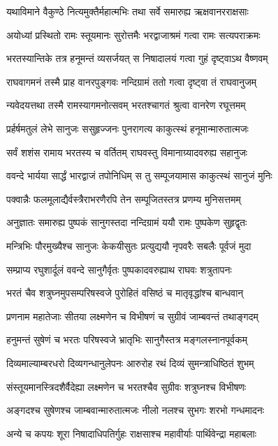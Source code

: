 \twolineshloka
{यथाविमाने वैकुण्ठे नित्यमुक्तैर्महात्मभिः}
{तथा सर्वे समारुह्य ऋक्षवानरराक्षसाः}%

\twolineshloka
{अयोध्यां प्रस्थितो रामः स्तूयमानः सुरोत्तमैः}
{भरद्वाजाश्रमं गत्वा रामः सत्यपराक्रमः}%

\twolineshloka
{भरतस्यान्तिके तत्र हनूमन्तं व्यसर्जयत्}
{स निषादालयं गत्वा गुहं दृष्ट्वाऽथ वैष्णवम्}%

\twolineshloka
{राघवागमनं तस्मै प्राह वानरपुङ्गवः}
{नन्दिग्रामं ततो गत्वा दृष्ट्वा तं राघवानुजम्}%

\twolineshloka
{न्यवेदयत्तथा तस्मै रामस्यागमनोत्सवम्}
{भरतश्चागतं श्रुत्वा वानरेण रघूत्तमम्}%

\twolineshloka
{प्रर्हर्षमतुलं लेभे सानुजः ससुहृज्जनः}
{पुनरागत्य काकुत्स्थं हनूमान्मारुतात्मजः}%

\twolineshloka
{सर्वं शशंस रामाय भरतस्य च वर्तितम्}
{राघवस्तु विमानाग्र्यादवरुह्य सहानुजः}%

\twolineshloka
{ववन्दे भार्यया सार्द्धं भारद्वाजं तपोनिधिम्}
{स तु सम्पूजयामास काकुत्स्थं सानुजं मुनिः}%

\twolineshloka
{पक्वान्नैः फलमूलाद्यैर्वस्त्रैराभरणैरपि}
{तेन सम्पूजितस्तत्र प्रणम्य मुनिसत्तमम्}%

\twolineshloka
{अनुज्ञातः समारुह्य पुष्पकं सानुगस्तदा}
{नन्दिग्रामं ययौ रामः पुष्पकेण सुहृद्वृतः}%

\twolineshloka
{मन्त्रिभिः पौरमुख्यैश्च सानुजः केकयीसुतः}
{प्रत्युद्ययौ नृपवरैः सबलैः पूर्वजं मुदा}%

\twolineshloka
{सम्प्राप्य रघुशार्दूलं ववन्दे सानुगैर्वृतः}
{पुष्पकादवरुह्याथ राघवः शत्रुतापनः}%

\twolineshloka
{भरतं चैव शत्रुघ्नमुपसम्परिषस्वजे}
{पुरोहितं वसिष्ठं च मातृवृद्धांश्च बान्धवान्}%

\twolineshloka
{प्रणनाम महातेजाः सीतया लक्ष्मणेन च}
{विभीषणं च सुग्रीवं जाम्बवन्तं तथाङ्गदम्}%

\twolineshloka
{हनुमन्तं सुषेणं च भरतः परिषस्वजे}
{भ्रातृभिः सानुगैस्तत्र मङ्गलस्नानपूर्वकम्}%

\twolineshloka
{दिव्यमाल्याम्बरधरो दिव्यगन्धानुलेपनः}
{आरुरोह रथं दिव्यं सुमन्त्राधिष्ठितं शुभम्}%

\twolineshloka
{संस्तूयमानस्त्रिदशैर्वैदेह्या लक्ष्मणेन च}
{भरतश्चैव सुग्रीवः शत्रुघ्नश्च विभीषणः}%

\twolineshloka
{अङ्गदश्च सुषेणश्च जाम्बवान्मारुतात्मजः}
{नीलो नलश्च सुभगः शरभो गन्धमादनः}%

\twolineshloka
{अन्ये च कपयः शूरा निषादाधिपतिर्गुहः}
{राक्षसाश्च महावीर्याः पार्थिवेन्द्रा महाबलाः}%

